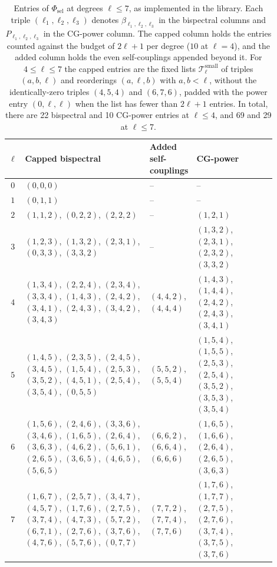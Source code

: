 \documentclass{article}
\theoremstyle{definition}
\theoremstyle{remark}
\theoremstyle{definition}
\begin{document}
\begin{table}[h]
  \caption{Entries of $\Phi_{\mathrm{sel}}$ at degrees $\ell\le 7$, as
    implemented in the library. Each triple $(\ell_1,\ell_2,\ell_3)$ denotes
    $\beta_{\ell_1,\ell_2,\ell_3}$ in the bispectral columns and
    $P_{\ell_1,\ell_2,\ell_3}$ in the CG-power column. The capped column holds the entries
    counted against the budget of $2\ell{+}1$ per degree ($10$ at $\ell=4$), and the added
    column holds the even self-couplings appended beyond it. For
    $4\le\ell\le 7$ the capped entries are the fixed lists
    $\mathcal{T}_\ell^{\mathrm{small}}$ of triples $(a,b,\ell)$ and reorderings $(a,\ell,b)$
    with $a,b<\ell$, without the identically-zero triples
    $(4,5,4)$ and $(6,7,6)$, padded with the power entry $(0,\ell,\ell)$ when the list has
    fewer than $2\ell{+}1$ entries. In total, there are 22 bispectral and 10 CG-power entries at
    $\ell\le4$, and 69 and 29 at $\ell\le7$.}
  \label{tab:Tsmall}
  \centering
  \footnotesize
  \setlength{\tabcolsep}{3pt}
  \begin{tabular}{@{}c>{\raggedright\arraybackslash}p{0.47\linewidth}>{\raggedright\arraybackslash}p{0.13\linewidth}>{\raggedright\arraybackslash}p{0.3\linewidth}@{}}
    \toprule
    $\ell$ & Capped bispectral & Added self-couplings & CG-power \\
    \midrule
    $0$ & $(0,0,0)$ & -- & -- \\
    $1$ & $(0,1,1)$ & -- & -- \\
    $2$ & $(1,1,2)$, $(0,2,2)$, $(2,2,2)$ & -- & $(1,2,1)$ \\
    $3$ & $(1,2,3)$, $(1,3,2)$, $(2,3,1)$, $(0,3,3)$, $(3,3,2)$ & -- & $(1,3,2)$, $(2,3,1)$, $(2,3,2)$, $(3,3,2)$ \\
    $4$ & $(1,3,4)$, $(2,2,4)$, $(2,3,4)$, $(3,3,4)$, $(1,4,3)$, $(2,4,2)$, $(3,4,1)$, $(2,4,3)$, $(3,4,2)$, $(3,4,3)$ & $(4,4,2)$, $(4,4,4)$ & $(1,4,3)$, $(1,4,4)$, $(2,4,2)$, $(2,4,3)$, $(3,4,1)$ \\
    $5$ & $(1,4,5)$, $(2,3,5)$, $(2,4,5)$, $(3,4,5)$, $(1,5,4)$, $(2,5,3)$, $(3,5,2)$, $(4,5,1)$, $(2,5,4)$, $(3,5,4)$, $(0,5,5)$ & $(5,5,2)$, $(5,5,4)$ & $(1,5,4)$, $(1,5,5)$, $(2,5,3)$, $(2,5,4)$, $(3,5,2)$, $(3,5,3)$, $(3,5,4)$ \\
    $6$ & $(1,5,6)$, $(2,4,6)$, $(3,3,6)$, $(3,4,6)$, $(1,6,5)$, $(2,6,4)$, $(3,6,3)$, $(4,6,2)$, $(5,6,1)$, $(2,6,5)$, $(3,6,5)$, $(4,6,5)$, $(5,6,5)$ & $(6,6,2)$, $(6,6,4)$, $(6,6,6)$ & $(1,6,5)$, $(1,6,6)$, $(2,6,4)$, $(2,6,5)$, $(3,6,3)$ \\
    $7$ & $(1,6,7)$, $(2,5,7)$, $(3,4,7)$, $(4,5,7)$, $(1,7,6)$, $(2,7,5)$, $(3,7,4)$, $(4,7,3)$, $(5,7,2)$, $(6,7,1)$, $(2,7,6)$, $(3,7,6)$, $(4,7,6)$, $(5,7,6)$, $(0,7,7)$ & $(7,7,2)$, $(7,7,4)$, $(7,7,6)$ & $(1,7,6)$, $(1,7,7)$, $(2,7,5)$, $(2,7,6)$, $(3,7,4)$, $(3,7,5)$, $(3,7,6)$ \\
    \bottomrule
  \end{tabular}
\end{table}
\end{document}
